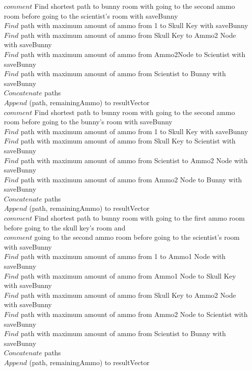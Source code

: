 \documentclass[10pt]{article}
\begin{document}
		$comment$  Find shortest path to bunny room with going to the second ammo room before going to the scientist's room with saveBunny \\
		 $Find$ path with maximum amount of ammo from 1 to Skull Key with saveBunny  \\
		 $Find$ path with maximum amount of ammo from Skull Key to Ammo2 Node with saveBunny \\
		 $Find$ path with maximum amount of ammo from Ammo2Node to Scientist with saveBunny \\
		 $Find$ path with maximum amount of ammo from Scientist to Bunny with saveBunny \\
		$Concatenate$ paths  \\
		$Append$ (path, remainingAmmo) to resultVector \\

		$comment$  Find shortest path to bunny room with going to the second ammo room before going to the bunny's room with saveBunny \\
		 $Find$ path with maximum amount of ammo from 1 to Skull Key with saveBunny  \\
		 $Find$ path with maximum amount of ammo from Skull Key to Scientist with saveBunny \\
		 $Find$ path with maximum amount of ammo from Scientist to Ammo2 Node with saveBunny \\
		 $Find$ path with maximum amount of ammo from Ammo2 Node to Bunny with saveBunny \\
		$Concatenate$ paths  \\
		$Append$ (path, remainingAmmo) to resultVector \\
		
		$comment$  Find shortest path to bunny room with going to the first ammo room before going to the skull key's room and \\
		$comment$ going to the second ammo room before going to the scientist's room with saveBunny  \\
		 $Find$ path with maximum amount of ammo from 1 to Ammo1 Node with saveBunny  \\
		 $Find$ path with maximum amount of ammo from Ammo1 Node to Skull Key with saveBunny \\
		 $Find$ path with maximum amount of ammo from Skull Key to Ammo2 Node with saveBunny \\
		 $Find$ path with maximum amount of ammo from Ammo2 Node to Scientist with saveBunny \\
		 $Find$ path with maximum amount of ammo from Scientist to Bunny with saveBunny \\
		$Concatenate$ paths  \\
		$Append$ (path, remainingAmmo) to resultVector \\
\end{document}
